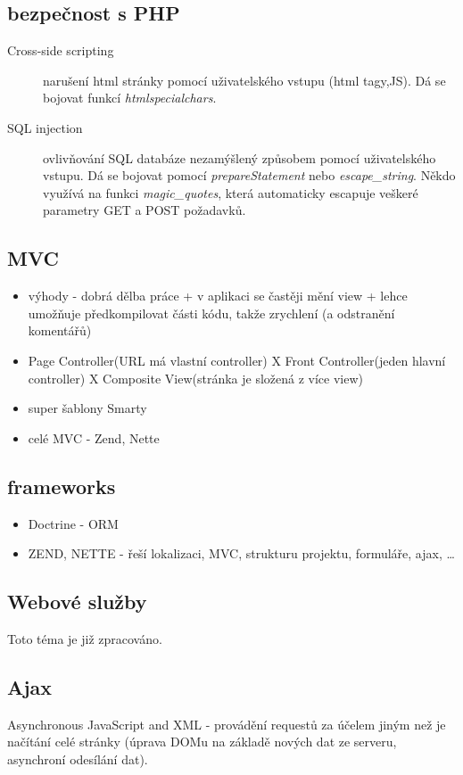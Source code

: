 \documentclass{scrreprt}
\begin{document}
\subsection{bezpečnost s PHP}
\begin{description}
  \item[Cross-side scripting] narušení html stránky pomocí uživatelského vstupu (html tagy,JS). Dá se bojovat funkcí \emph{htmlspecialchars}. 
  \item[SQL injection] ovlivňování SQL databáze nezamýšlený způsobem pomocí uživatelského vstupu. Dá se bojovat pomocí \emph{prepareStatement} nebo
  \emph{escape_string}. Někdo využívá na funkci \emph{magic_quotes}, která automaticky escapuje veškeré parametry GET a POST požadavků.
\end{description}


\subsection{MVC}
\begin{itemize}
  \item výhody - dobrá dělba práce + v aplikaci se častěji mění view + lehce umožňuje předkompilovat části kódu, takže zrychlení (a odstranění
  komentářů)
  \item Page Controller(URL má vlastní controller) X Front Controller(jeden hlavní controller) X Composite View(stránka je složená z více view)
  \item super šablony Smarty
  \item celé MVC - Zend, Nette  
\end{itemize}


\subsection{frameworks}
\begin{itemize}
  \item Doctrine - ORM
  \item ZEND, NETTE  - řeší lokalizaci, MVC, strukturu projektu, formuláře, ajax, \ldots
\end{itemize}

\subsection{Webové služby}
Toto téma je již zpracováno.

\subsection{Ajax}
Asynchronous JavaScript and XML - provádění requestů za účelem jiným než je načítání celé stránky (úprava DOMu na základě nových dat ze serveru,
asynchroní odesílání dat).
\end{document}
